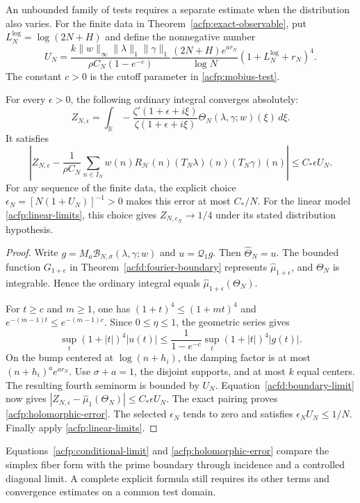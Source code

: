 An unbounded family of tests requires a separate estimate when the
distribution also varies.
For the finite data in Theorem~\ref{acfp:exact-observable}, put
$L_N^{\mathrm{log}}=\log(2N+H)$ and define the nonnegative number
\begin{equation}\label{acfp:boundary-control}
 U_N=
 \frac{k\|w\|_\infty\|\lambda\|_1\|\gamma\|_1}
      {\rho C_N(1-e^{-c})}
 \frac{(2N+H)e^{ar_N}}{\log N}
       (1+L_N^{\mathrm{log}}+r_N)^4.
\end{equation}
The constant $c>0$ is the cutoff parameter in
\eqref{acfp:mobius-test}.

\begin{proposition}
\label{acfp:holomorphic-pairing}
For every $\epsilon>0$, the following ordinary integral converges absolutely:
\[
 Z_{N,\epsilon}
   =\int_{\mathbb R}
       -\frac{\zeta'(1+\epsilon+i\xi)}{\zeta(1+\epsilon+i\xi)}
          \Theta_N(\lambda,\gamma;w)(\xi)\,d\xi.
\]
It satisfies
\begin{equation}\label{acfp:holomorphic-error}
 \left|Z_{N,\epsilon}
   -\frac1{\rho C_N}\sum_{n\in I_N}
      w(n)R_{\mathcal H}(n)(T_N\lambda)(n)(T_N\gamma)(n)\right|
       \leq C_*\epsilon U_N.
\end{equation}
For any sequence of the finite data, the explicit choice
$\epsilon_N=[N(1+U_N)]^{-1}>0$ makes this error at most $C_*/N$.
For the linear model \eqref{acfp:linear-limits}, this choice gives
$Z_{N,\epsilon_N}\to1/4$ under its stated distribution hypothesis.
\end{proposition}

\begin{proof}
Write $g=M_a\mathcal B_{N,\sigma}(\lambda,\gamma;w)$ and
$u=\mathcal Q_1g$.
Then $\widehat\Theta_N=u$.
The bounded function $G_{1+\epsilon}$ in
Theorem~\ref{acfd:fourier-boundary} represents
$\widehat\mu_{1+\epsilon}$, and $\Theta_N$ is integrable.
Hence the ordinary integral equals
$\widehat\mu_{1+\epsilon}(\Theta_N)$.

For $t\geq c$ and $m\geq1$, one has
$(1+t)^4\leq(1+mt)^4$ and
$e^{-(m-1)t}\leq e^{-(m-1)c}$.
Since $0\leq\eta\leq1$, the geometric series gives
\[
 \sup_t(1+|t|)^4|u(t)|
       \leq\frac1{1-e^{-c}}\sup_t(1+|t|)^4|g(t)|.
\]
On the bump centered at $\log(n+h_i)$, the damping factor is at most
$(n+h_i)^a e^{ar_N}$.
Use $\sigma+a=1$, the disjoint supports, and at most $k$ equal centers.
The resulting fourth seminorm is bounded by $U_N$.
Equation~\eqref{acfd:boundary-limit} now gives
$|Z_{N,\epsilon}-\widehat\mu_1(\Theta_N)|\leq C_*\epsilon U_N$.
The exact pairing proves \eqref{acfp:holomorphic-error}.
The selected $\epsilon_N$ tends to zero and satisfies
$\epsilon_NU_N\leq1/N$.
Finally apply \eqref{acfp:linear-limits}.
\end{proof}

Equations~\eqref{acfp:conditional-limit} and \eqref{acfp:holomorphic-error}
compare the simplex fiber form with the prime boundary through incidence
and a controlled diagonal limit.
A complete explicit formula still requires its other terms and convergence
estimates on a common test domain.

